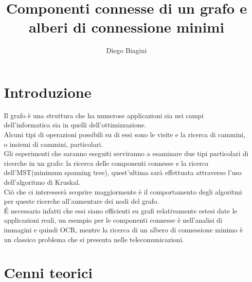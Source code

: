 \documentclass[]{article}
\author{Diego Biagini}
\title{Componenti connesse di un grafo e \\alberi di connessione minimi}
\date{}
\begin{document}
\maketitle
\section{Introduzione}
Il grafo è una struttura che ha numerose applicazioni sia nei campi dell'informatica sia in quelli dell'ottimizzazione.\\
Alcuni tipi di operazioni possibili su di essi sono le visite e la ricerca di cammini, o insiemi di cammini, particolari.\\
Gli esperimenti che saranno eseguiti serviranno a esaminare due tipi particolari di ricerche in un grafo: la ricerca delle componenti connesse e la ricerca dell'MST(minimum spanning tree), quest'ultima sarà effettuata attraverso l'uso dell'algoritmo di Kruskal.\\
Ciò che ci interesserà scoprire maggiormente è il comportamento degli algoritmi per queste ricerche all'aumentare dei nodi del grafo.\\
\'E necessario infatti che essi siano efficienti su grafi relativamente estesi date le applicazioni reali, un esempio per le componenti connesse è nell'analisi di immagini e quindi OCR, mentre la ricerca di un albero di connessione minimo è un classico problema che si presenta nelle telecomunicazioni.\\ 
\section{Cenni teorici}
\end{document}
